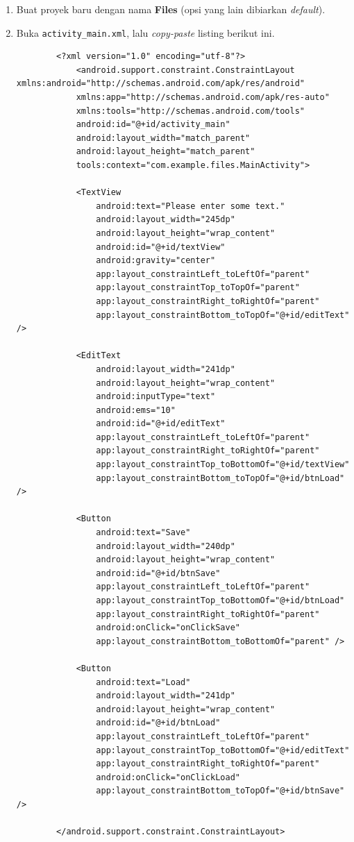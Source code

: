 \documentclass{scrartcl}
\begin{document}
	\begin{enumerate}
		\item Buat proyek baru dengan nama \textbf{Files} (opsi yang lain dibiarkan \textit{default}).
		\item Buka \texttt{activity\_main.xml}, lalu \textit{copy-paste} listing berikut ini.
		\begin{verbatim}
		<?xml version="1.0" encoding="utf-8"?>
			<android.support.constraint.ConstraintLayout xmlns:android="http://schemas.android.com/apk/res/android"
			xmlns:app="http://schemas.android.com/apk/res-auto"
			xmlns:tools="http://schemas.android.com/tools"
			android:id="@+id/activity_main"
			android:layout_width="match_parent"
			android:layout_height="match_parent"
			tools:context="com.example.files.MainActivity">
			
			<TextView
				android:text="Please enter some text."
				android:layout_width="245dp"
				android:layout_height="wrap_content"
				android:id="@+id/textView"
				android:gravity="center"
				app:layout_constraintLeft_toLeftOf="parent"
				app:layout_constraintTop_toTopOf="parent"
				app:layout_constraintRight_toRightOf="parent"
				app:layout_constraintBottom_toTopOf="@+id/editText" />
				
			<EditText
				android:layout_width="241dp"
				android:layout_height="wrap_content"
				android:inputType="text"
				android:ems="10"
				android:id="@+id/editText"
				app:layout_constraintLeft_toLeftOf="parent"
				app:layout_constraintRight_toRightOf="parent"
				app:layout_constraintTop_toBottomOf="@+id/textView"
				app:layout_constraintBottom_toTopOf="@+id/btnLoad" />
			
			<Button
				android:text="Save"
				android:layout_width="240dp"
				android:layout_height="wrap_content"
				android:id="@+id/btnSave"
				app:layout_constraintLeft_toLeftOf="parent"
				app:layout_constraintTop_toBottomOf="@+id/btnLoad"
				app:layout_constraintRight_toRightOf="parent"
				android:onClick="onClickSave"
				app:layout_constraintBottom_toBottomOf="parent" />
				
			<Button
				android:text="Load"
				android:layout_width="241dp"
				android:layout_height="wrap_content"
				android:id="@+id/btnLoad"
				app:layout_constraintLeft_toLeftOf="parent"
				app:layout_constraintTop_toBottomOf="@+id/editText"
				app:layout_constraintRight_toRightOf="parent"
				android:onClick="onClickLoad"
				app:layout_constraintBottom_toTopOf="@+id/btnSave" />
		
		</android.support.constraint.ConstraintLayout>
		\end{verbatim}
		

\end{enumerate}
\end{document}
